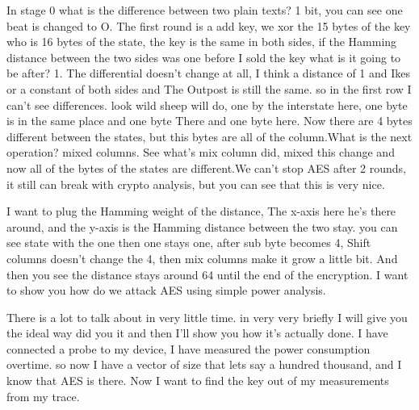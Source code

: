 In stage 0 what is the difference between two plain texts? 1 bit, you can see one beat is changed to O. The first round is a add key, we xor the 15 bytes of the key who is 16 bytes of the state, the key is the same in both sides, if the Hamming distance between the two sides was one before I sold the key what is it going to be after? 1. The differential doesn't change at all, I think a distance of 1 and Ikes or a constant of both sides and The Outpost is still the same. so in the first row I can't see differences. look wild sheep will do, one by the interstate here, one byte is in the same place and one byte There and one byte here. Now there are 4 bytes different between the states, but this bytes are all of the column.What is the next operation? mixed columns. See what's mix column did, mixed this change and now all of the bytes of the states are different.We can't stop AES after 2 rounds, it still can break with crypto analysis, but you can see that this is very nice.
 
I want to plug the Hamming weight of the distance, The x-axis here he's there around, and the y-axis is the Hamming distance between the two stay. you can see state with the one then one stays one, after sub byte becomes 4, Shift columns doesn't change the 4, then mix columns make it grow a little bit. And then you see the distance stays around 64 until the end of the encryption.
I want to show you how do we attack AES using simple power analysis.

There is a lot to talk about in very little time. in very very briefly I will give you the ideal way did you it and then I'll show you how it's actually done.
I have connected a probe to my device, I have measured the power consumption overtime. so now I have a vector of size that lets say a hundred thousand, and I know that AES is there. Now I want to find the key out of my measurements from my trace.

